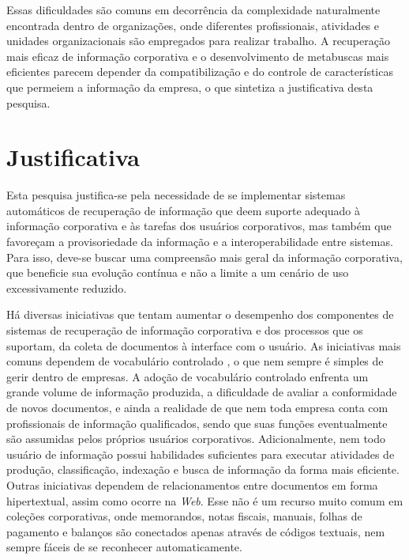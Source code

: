 Essas dificuldades são comuns em decorrência da complexidade naturalmente encontrada dentro de organizações, onde diferentes profissionais, atividades e unidades organizacionais são empregados para realizar trabalho. A recuperação mais eficaz de informação corporativa e o desenvolvimento de metabuscas mais eficientes parecem depender da compatibilização e do controle de características que permeiem a informação da empresa, o que sintetiza a justificativa desta pesquisa.




\section{Justificativa} %

Esta pesquisa justifica-se pela necessidade de se implementar sistemas automáticos de recuperação de informação que deem suporte adequado à informação corporativa e às tarefas dos usuários corporativos, mas também que favoreçam a provisoriedade da informação e a interoperabilidade entre sistemas. Para isso, deve-se buscar uma compreensão mais geral da informação corporativa, que beneficie sua evolução contínua e não a limite a um cenário de uso excessivamente reduzido.

Há diversas iniciativas que tentam aumentar o desempenho dos componentes de sistemas de recuperação de informação corporativa e dos processos que os suportam, da coleta de documentos à interface com o usuário. As iniciativas mais comuns dependem de vocabulário controlado \cite{ontology12}, o que nem sempre é simples de gerir dentro de empresas. A adoção de vocabulário controlado enfrenta um grande volume de informação produzida, a dificuldade de avaliar a conformidade de novos documentos, e ainda a realidade de que nem toda empresa conta com profissionais de informação qualificados, sendo que suas funções eventualmente são assumidas pelos próprios usuários corporativos. Adicionalmente, nem todo usuário de informação possui habilidades suficientes para executar atividades de produção, classificação, indexação e busca de informação da forma mais eficiente.
Outras iniciativas dependem de relacionamentos entre documentos em forma hipertextual, assim como ocorre na \textit{Web}. Esse não é um recurso muito comum em coleções corporativas, onde memorandos, notas fiscais, manuais, folhas de pagamento e balanços são conectados apenas através de códigos textuais, nem sempre fáceis de se reconhecer automaticamente.

